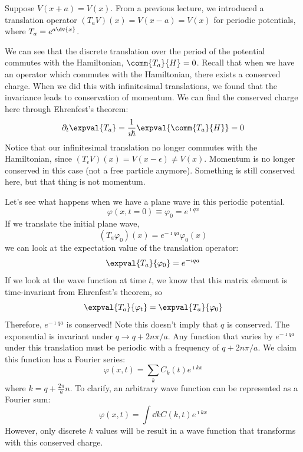 \documentclass[a4paper,twoside,master.tex]{subfiles}
\begin{document}
Suppose $ V(x+a) = V(x) $. From a previous lecture, we introduced a translation operator $ (T_a V)(x) = V(x-a) = V(x)$ for periodic potentials, where $ T_a = e^{a\dv{x}} $.

We can see that the discrete translation over the period of the potential commutes with the Hamiltonian, $ \comm{T_a}{H} = 0 $. Recall that when we have an operator which commutes with the Hamiltonian, there exists a conserved charge. When we did this with infinitesimal translations, we found that the invariance leads to conservation of momentum. We can find the conserved charge here through Ehrenfest's theorem:
\begin{equation}
    \partial_t \expval{T_a} = \frac{1}{\imath \hbar} \expval{\comm{T_a}{H}} = 0
\end{equation}
Notice that our infinitesimal translation no longer commutes with the Hamiltonian, since $ (T_\epsilon V)(x) = V(x-\epsilon) \neq V(x) $. Momentum is no longer conserved in this case (not a free particle anymore). Something is still conserved here, but that thing is not momentum.

Let's see what happens when we have a plane wave in this periodic potential.
\begin{equation}
    \varphi(x, t=0) \equiv \varphi_0 = e^{\imath qx}
\end{equation}
If we translate the initial plane wave,
\begin{equation}
    (T_a \varphi_0)(x) = e^{- \imath q a} \varphi_0(x)
\end{equation}
we can look at the expectation value of the translation operator:
\begin{equation}
    \expval{T_a}{\varphi_0} = e^{-\imath qa}
\end{equation}
If we look at the wave function at time $ t $, we know that this matrix element is time-invariant from Ehrenfest's theorem, so
\begin{equation}
    \expval{T_a}{\varphi_t} = \expval{T_a}{\varphi_0}
\end{equation}
Therefore, $ e^{-\imath qa} $ is conserved! Note this doesn't imply that $ q $ is conserved. The exponential is invariant under $ q \to q + 2n \pi/a$. Any function that varies by $ e^{-\imath qa} $ under this translation must be periodic with a frequency of $ q + 2n\pi/a $. We claim this function has a Fourier series:
\begin{equation}
    \varphi(x,t) = \sum_{k} C_k(t) e^{\imath kx}
\end{equation}
where $ k = q + \frac{2 \pi}{a} n $. To clarify, an arbitrary wave function can be represented as a Fourier sum:
\begin{equation}
    \varphi(x,t) = \int \dd{k} C(k,t) e^{\imath kx}
\end{equation}
However, only discrete $ k $ values will be result in a wave function that transforms with this conserved charge.
\end{document}
